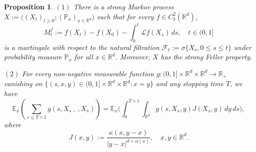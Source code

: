 \documentclass[a4paper,11pt]{amsart}
\renewcommand{\le}{\leqslant}
\renewcommand{\ge}{\geqslant}
\newcommand{\R}{\mathds R}
\newcommand{\Pp}{\mathds P}
\newcommand{\Ee}{\mathds E}
\newcommand{\K}{\kappa}
\newcommand{\A}{\alpha}
\def\LL{{\mathcal L}}
\newtheorem{proposition}[theorem]{Proposition}
\theoremstyle{definition}
\begin{document}
\begin{proposition}\label{p4-4}
$(1)$ There is a strong Markov process $X:=\big((X_t)_{t \ge 0}; (\Pp_x)_{x\in \R^d}\big)$ such that for every
$f \in C_b^2(\R^d)$,
\begin{equation}\label{p4-4-0}
M_t^f:=f(X_t)-f(X_0)-\int_0^t \LL f(X_s)\,ds,\quad t \in (0,1]
\end{equation}
is a martingale with respect to the natural filtration $\mathscr{F}_t:=\sigma\{X_s,0\le s\le t\}$ under probability
measure $\Pp_x$ for all $x \in \R^d$. Moreover, $X$ has the strong Feller property.

$(2)$ For every non-negative measurable function $g:(0,1]\times \R^d \times \R^d \rightarrow \R_+$  vanishing
on $\{(s,x,y)\in (0,1]\times \R^d \times \R^d: x=y\}$ and any stopping time $T$, we have
\begin{equation}\label{p4-4-1}
\Ee_x\left(\sum_{s \le T\wedge 1}g(s,X_{s-},X_s)\right)=\Ee_x \bigg(\int_0^{T\wedge 1}\int_{\R^d}
g(s,X_s,y)J(X_s,y)\,dy\,ds\bigg),
\end{equation} where $$J(x,y):=\frac{\K(x,y-x)}{|y-x|^{d+\A(x)}},\quad x,y \in \R^d.$$
\end{proposition}
\end{document}
